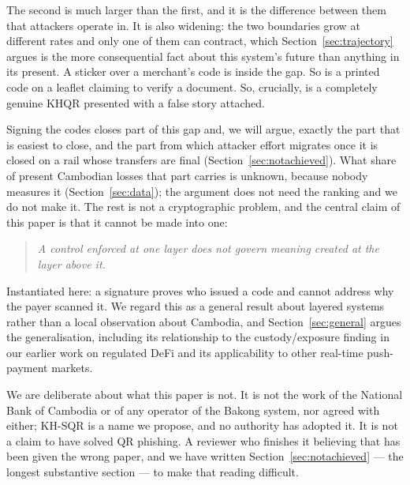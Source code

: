 \documentclass[10pt,a4paper,twocolumn]{article}
\begin{document}
\noindent The second is much larger than the first, and it is the difference
between them that attackers operate in. It is also widening: the two boundaries
grow at different rates and only one of them can contract, which
Section~\ref{sec:trajectory} argues is the more consequential fact about this
system's future than anything in its present. A sticker over a merchant's code is
inside the gap. So is a printed code on a leaflet claiming to verify a document.
So, crucially, is a completely genuine KHQR presented with a false story
attached.

Signing the codes closes part of this gap and, we will argue, exactly the part
that is easiest to close, and the part from which attacker effort migrates once
it is closed on a rail whose transfers are final (Section~\ref{sec:notachieved}).
What share of present Cambodian losses that part carries is unknown, because
nobody measures it (Section~\ref{sec:data}); the argument does not need the
ranking and we do not make it. The rest is not a
cryptographic problem, and the central claim of this paper is that it cannot be
made into one:

\begin{quote}
\emph{A control enforced at one layer does not govern meaning created at the
layer above it.}
\end{quote}

\noindent Instantiated here: a signature proves who issued a code and cannot
address why the payer scanned it. We regard this as a general result about
layered systems rather than a local observation about Cambodia, and
Section~\ref{sec:general} argues the generalisation, including its relationship
to the custody/exposure finding in our earlier work on regulated DeFi
\citep{sengtha2026csb} and its applicability to other real-time push-payment
markets.

We are deliberate about what this paper is not. It is not the work of the
National Bank of Cambodia or of any operator of the Bakong system, nor agreed
with either; KH-SQR is a name we propose, and no authority has adopted it. It is
not a claim to have solved QR phishing. A reviewer who finishes it believing that has been given the wrong
paper, and we have written Section~\ref{sec:notachieved} --- the longest
substantive section --- to make that reading difficult.
\end{document}
